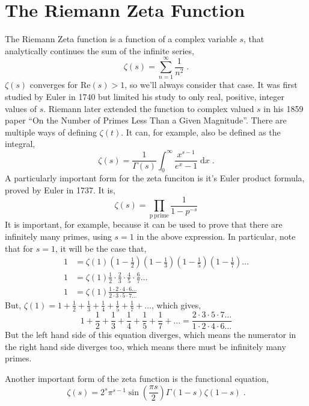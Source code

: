 \documentclass{amsproc}
\newcommand{\be}{\begin{equation}}
\newcommand{\ee}{\end{equation}}
\newcommand{\df}{\; \mathrm{d}}
\theoremstyle{definition}
\theoremstyle{remark}
\numberwithin{equation}{section}
\begin{document}
\section{The Riemann Zeta Function}
The Riemann Zeta function is a function of a complex variable $s$, that analytically continues the sum of the infinite series,
\be
\zeta(s) = \sum_{n = 1}^{\infty} \frac{1}{n^2} \;.
\ee
$\zeta(s)$ converges for $\mathrm{Re}(s) > 1$, so we'll always consider that case. It was first studied by Euler in 1740 but limited his study to only real, positive, integer values of $s$. Riemann later extended the function to complex valued $s$ in his 1859 paper ``On the Number of Primes Less Than a Given Magnitude''. There are multiple ways of defining $\zeta(t)$. It can, for example, also be defined as the integral,
\be
\zeta(s) = \frac{1}{ \Gamma(s) } \int_0^{\infty} \frac{ x^{s -1} }{ e^x - 1} \df x \;.
\ee
A particularly important form for the zeta funciton is it's Euler product formula, proved by Euler in 1737. It is,
\be
\zeta(s) = \prod_{\mathrm{p~prime}} \frac{1}{1 - p^{-s}}
\ee
It is important, for example, because it can be used to prove that there are infinitely many primes, using $s = 1$ in the above expression. In particular, note that for $s = 1$, it will be the case that,
\begin{align*}
 1 &= \zeta(1) \left( 1 - \frac{1}{2} \right) \left( 1 - \frac{1}{3} \right) \left( 1 - \frac{1}{5} \right) \left( 1 - \frac{1}{7} \right) \ldots \\
 1 &= \zeta(1) \frac{1}{2} \cdot \frac{2}{3} \cdot \frac{4}{5} \cdot \frac{6}{7} \ldots \\
  1 &= \zeta(1) \frac{1 \cdot 2 \cdot 4 \cdot 6 \ldots}{2 \cdot 3 \cdot 5 \cdot 7 \ldots } 
\end{align*}
But, $\zeta(1) = 1 + \frac{1}{2} + \frac{1}{3} + \frac{1}{4} + \frac{1}{5} + \frac{1}{7} + \ldots$, which gives,
\begin{equation*}
 1 + \frac{1}{2} + \frac{1}{3} + \frac{1}{4} + \frac{1}{5} + \frac{1}{7} + \ldots =  \frac{2 \cdot 3 \cdot 5 \cdot 7 \ldots }{1 \cdot 2 \cdot 4 \cdot 6 \ldots}
\end{equation*}
But the left hand side of this equation diverges, which means the numerator in the right hand side diverges too, which means there must be infinitely many primes.  

Another important form of the zeta function is the functional equation,
\be
\zeta(s) = 2^s \pi^{s - 1} \sin{ \left( \frac{\pi s}{2} \right) } \Gamma(1 - s) \zeta( 1 - s) \;.
\ee
\end{document}
